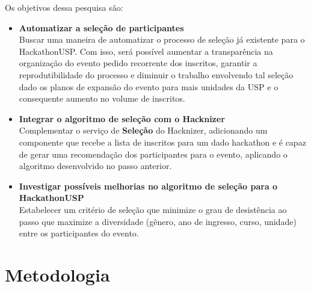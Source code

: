 \documentclass[10pt,twoside,a4paper]{article}
\begin{document}
    Os objetivos dessa pesquisa são:
    \begin{itemize}
        \item \textbf{Automatizar a seleção de participantes}\\
          Buscar uma maneira de automatizar o processo de seleção já existente para o HackathonUSP. Com isso, será possível aumentar a transparência na organização do evento \textemdash pedido recorrente dos inscritos, garantir a reprodutibilidade do processo e diminuir o trabalho envolvendo tal seleção \textemdash dado os planos de expansão do evento para mais unidades da USP e o consequente aumento no volume de inscritos.
        
        \item \textbf{Integrar o algoritmo de seleção com o Hacknizer}\\
          Complementar o serviço de \textbf{Seleção} do Hacknizer, adicionando um componente que recebe a lista de inscritos para um dado hackathon e é capaz de gerar uma recomendação dos participantes para o evento, aplicando o algoritmo desenvolvido no passo anterior.
        
        \item \textbf{Investigar possíveis melhorias no algoritmo de seleção para o HackathonUSP}\\
          Estabelecer um critério de seleção que minimize o grau de desistência ao passo que maximize a diversidade (gênero, ano de ingresso, curso, unidade) entre os participantes do evento.
    \end{itemize}
    
    
\section{Metodologia}
      
\end{document}
